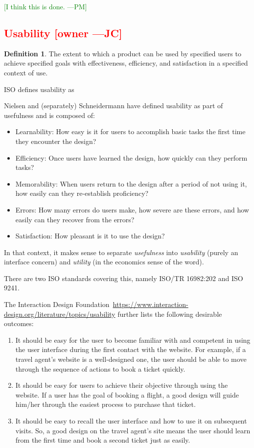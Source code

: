 \documentclass[letterpaper,cleveref]{lipics-v2019}
\newcommand{\authornote}[3]{\textcolor{#1}{[#3 ---#2]}}
\newcommand{\authornote}[3]{}
\newcommand{\jc}[1]{\authornote{red}{JC}{#1}} %
\newcommand{\pmi}[1]{\authornote{green}{PM}{#1}} %
\newcommand{\notdone}[1]{\textcolor{red}{#1}}
\theoremstyle{definition}
\newtheorem{defn}{Definition}
\begin{document}
\pmi{I think this is done.}

\subsection{\notdone{Usability} \jc{owner}} 

\begin{defn}
The extent to which a product can be used by specified users to achieve
specified goals with effectiveness, efficiency, and satisfaction in a specified
context of use.
\end{defn}
ISO defines usability as

Nielsen and (separately) Schneidermann have defined usability as part of usefulness and
is composed of:
\begin{itemize}
\item Learnability: How easy is it for users to accomplish basic tasks the
  first time they encounter the design?
\item Efficiency: Once users have learned the design, how quickly can they perform tasks?
\item Memorability: When users return to the design after a period of not using
  it, how easily can they re-establish proficiency?
\item Errors: How many errors do users make, how severe are these errors, and
  how easily can they recover from the errors?
\item Satisfaction: How pleasant is it to use the design?
\end{itemize}
In that context, it makes sense to separate \emph{usefulness} into
\emph{usability} (purely an interface concern) and \emph{utility} (in the economics
sense of the word).

There are two ISO standards covering this, namely ISO/TR 16982:202 and ISO 9241. 

The Interaction Design Foundation~\url{https://www.interaction-design.org/literature/topics/usability}
further lists the following desirable outcomes:

\begin{enumerate}
\item It should be easy for the user to become familiar with and competent in using
the user interface during the first contact with the website. For example, if a
travel agent’s website is a well-designed one, the user should be able to move
through the sequence of actions to book a ticket quickly.
\item It should be easy for users to achieve their objective through using the
website. If a user has the goal of booking a flight, a good design will guide
him/her through the easiest process to purchase that ticket.
\item It should be easy to recall the user interface and how to use it on
subsequent visits. So, a good design on the travel agent’s site means the user
should learn from the first time and book a second ticket just as easily.
\end{enumerate}
\end{document}
